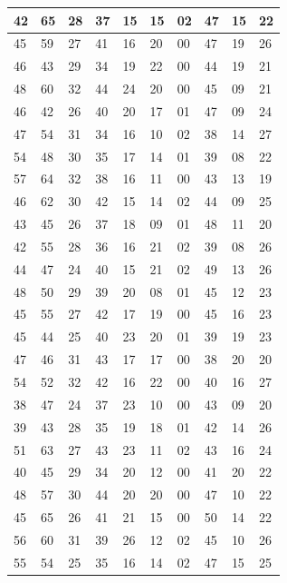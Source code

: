 \documentclass[a4paper]{scrartcl}
\begin{document}
\begin{table}[htb]
\begin{adjustwidth}{-2cm}{-2cm}
\begin{tabular}{| l | l | l | l | l | l | l | l | l | l |}
			\hline
			42 & 65 & 28 & 37 & 15 & 15 & 02 & 47 & 15 & 22 \\
			\hline
			45 & 59 & 27 & 41 & 16 & 20 & 00 & 47 & 19 & 26 \\
			\hline
			46 & 43 & 29 & 34 & 19 & 22 & 00 & 44 & 19 & 21 \\
			\hline
			48 & 60 & 32 & 44 & 24 & 20 & 00 & 45 & 09 & 21 \\
			\hline
			46 & 42 & 26 & 40 & 20 & 17 & 01 & 47 & 09 & 24 \\
			\hline
			47 & 54 & 31 & 34 & 16 & 10 & 02 & 38 & 14 & 27 \\
			\hline
			54 & 48 & 30 & 35 & 17 & 14 & 01 & 39 & 08 & 22 \\
			\hline
			57 & 64 & 32 & 38 & 16 & 11 & 00 & 43 & 13 & 19 \\
			\hline
			46 & 62 & 30 & 42 & 15 & 14 & 02 & 44 & 09 & 25 \\
			\hline
			43 & 45 & 26 & 37 & 18 & 09 & 01 & 48 & 11 & 20 \\
			\hline
			42 & 55 & 28 & 36 & 16 & 21 & 02 & 39 & 08 & 26 \\
			\hline
			44 & 47 & 24 & 40 & 15 & 21 & 02 & 49 & 13 & 26 \\
			\hline
			48 & 50 & 29 & 39 & 20 & 08 & 01 & 45 & 12 & 23 \\
			\hline
			45 & 55 & 27 & 42 & 17 & 19 & 00 & 45 & 16 & 23 \\
			\hline
			45 & 44 & 25 & 40 & 23 & 20 & 01 & 39 & 19 & 23 \\
			\hline
			47 & 46 & 31 & 43 & 17 & 17 & 00 & 38 & 20 & 20 \\
			\hline
			54 & 52 & 32 & 42 & 16 & 22 & 00 & 40 & 16 & 27 \\
			\hline
			38 & 47 & 24 & 37 & 23 & 10 & 00 & 43 & 09 & 20 \\
			\hline
			39 & 43 & 28 & 35 & 19 & 18 & 01 & 42 & 14 & 26 \\
			\hline
			51 & 63 & 27 & 43 & 23 & 11 & 02 & 43 & 16 & 24 \\
			\hline
			40 & 45 & 29 & 34 & 20 & 12 & 00 & 41 & 20 & 22 \\
			\hline
			48 & 57 & 30 & 44 & 20 & 20 & 00 & 47 & 10 & 22 \\
			\hline
			45 & 65 & 26 & 41 & 21 & 15 & 00 & 50 & 14 & 22 \\
			\hline
			56 & 60 & 31 & 39 & 26 & 12 & 02 & 45 & 10 & 26 \\
			\hline
			55 & 54 & 25 & 35 & 16 & 14 & 02 & 47 & 15 & 25 \\

\end{tabular}
\end{adjustwidth}
\end{table}
\end{document}
